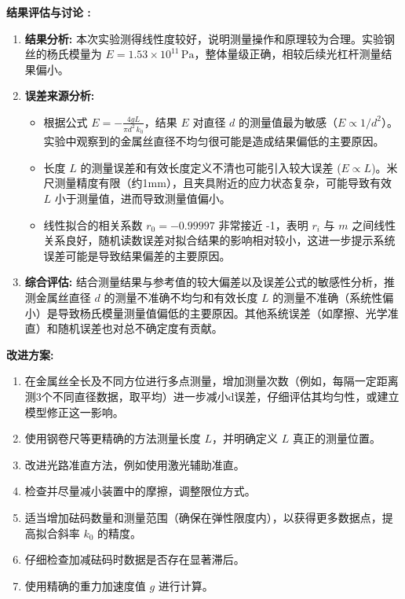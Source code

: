 \documentclass[12pt]{article}
\begin{document}
\textbf{结果评估与讨论 :}
\begin{enumerate}
    \item \textbf{结果分析:} 本次实验测得线性度较好，说明测量操作和原理较为合理。实验钢丝的杨氏模量为 $E = 1.53 \times 10^{11}\,\text{Pa}$，整体量级正确，相较后续光杠杆测量结果偏小。
    \item \textbf{误差来源分析:}
        \begin{itemize}
            \item 根据公式 $E = -\frac {4gL}{\pi d^2\,k_0}$，结果 $E$ 对直径 $d$ 的测量值最为敏感（$E \propto 1/d^2$）。实验中观察到的金属丝直径不均匀很可能是造成结果偏低的主要原因。
            \item 长度 $L$ 的测量误差和有效长度定义不清也可能引入较大误差 ($E \propto L$)。米尺测量精度有限（约1mm），且夹具附近的应力状态复杂，可能导致有效 $L$ 小于测量值，进而导致测量值偏小。
            \item 线性拟合的相关系数 $r_0 = -0.99997$ 非常接近 -1，表明 $r_i$ 与 $m$ 之间线性关系良好，随机读数误差对拟合结果的影响相对较小，这进一步提示系统误差可能是导致结果偏差的主要原因。
        \end{itemize}
    \item \textbf{综合评估:} 结合测量结果与参考值的较大偏差以及误差公式的敏感性分析，推测金属丝直径 $d$ 的测量不准确不均匀和有效长度 $L$ 的测量不准确（系统性偏小）是导致杨氏模量测量值偏低的主要原因。其他系统误差（如摩擦、光学准直）和随机误差也对总不确定度有贡献。
\end{enumerate}

\textbf{改进方案:}
\begin{enumerate}
            \item 在金属丝全长及不同方位进行多点测量，增加测量次数（例如，每隔一定距离测3个不同直径数据，取平均）进一步减小d误差，仔细评估其均匀性，或建立模型修正这一影响。
            \item 使用钢卷尺等更精确的方法测量长度 $L$，并明确定义 $L$ 真正的测量位置。
            \item 改进光路准直方法，例如使用激光辅助准直。
            \item 检查并尽量减小装置中的摩擦，调整限位方式。
            \item 适当增加砝码数量和测量范围（确保在弹性限度内），以获得更多数据点，提高拟合斜率 $k_0$ 的精度。
            \item 仔细检查加减砝码时数据是否存在显著滞后。
            \item 使用精确的重力加速度值 $g$ 进行计算。
\end{enumerate}
\end{document}
